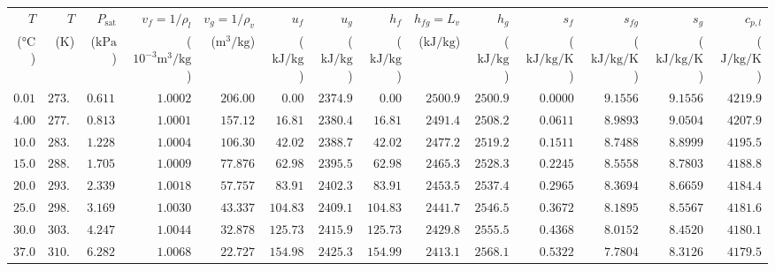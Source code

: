 \documentclass[10pt,twoside,openany,letterpaper]{book}
\begin{document}
\begin{quicksheet}
\begin{formulacard}
\par\smallskip\noindent
\scriptsize\setlength{\tabcolsep}{3.1pt}\renewcommand{\arraystretch}{1.06}
\begin{tabularx}{\linewidth}{@{}r r r r r r r r r r r r r r@{}}
\toprule
$T$ & $T$ & $P_{\mathrm{sat}}$ & $v_f = 1/\rho_l$ & $v_g = 1/\rho_v$ & $u_f$ & $u_g$ & $h_f$ & $h_{fg} = L_v$ & $h_g$ & $s_f$ & $s_{fg}$ & $s_g$ & $c_{p,l}$ \\
($\si{\celsius}$) & ($\si{\kelvin}$) & ($\si{\kilo\pascal}$) & ($10^{-3}\si{\cubic\meter\per\kilogram}$) & ($\si{\cubic\meter\per\kilogram}$) & ($\si{\kilo\joule\per\kilogram}$) & ($\si{\kilo\joule\per\kilogram}$) & ($\si{\kilo\joule\per\kilogram}$) & ($\si{\kilo\joule\per\kilogram}$) & ($\si{\kilo\joule\per\kilogram}$) & ($\si{\kilo\joule\per\kilogram\per\kelvin}$) & ($\si{\kilo\joule\per\kilogram\per\kelvin}$) & ($\si{\kilo\joule\per\kilogram\per\kelvin}$) & ($\si{\joule\per\kilogram\per\kelvin}$) \\
\midrule
$0.01$ & $273.16$ & $0.6117$ & $1.0002$ & $206.00$ & $0.00$ & $2374.9$ & $0.00$ & $2500.9$ & $2500.9$ & $0.0000$ & $9.1556$ & $9.1556$ & $4219.9$ \\
$4.00$ & $277.15$ & $0.8135$ & $1.0001$ & $157.12$ & $16.81$ & $2380.4$ & $16.81$ & $2491.4$ & $2508.2$ & $0.0611$ & $8.9893$ & $9.0504$ & $4207.9$ \\
$10.00$ & $283.15$ & $1.2282$ & $1.0004$ & $106.30$ & $42.02$ & $2388.7$ & $42.02$ & $2477.2$ & $2519.2$ & $0.1511$ & $8.7488$ & $8.8999$ & $4195.5$ \\
$15.00$ & $288.15$ & $1.7058$ & $1.0009$ & $77.876$ & $62.98$ & $2395.5$ & $62.98$ & $2465.3$ & $2528.3$ & $0.2245$ & $8.5558$ & $8.7803$ & $4188.8$ \\
$20.00$ & $293.15$ & $2.3393$ & $1.0018$ & $57.757$ & $83.91$ & $2402.3$ & $83.91$ & $2453.5$ & $2537.4$ & $0.2965$ & $8.3694$ & $8.6659$ & $4184.4$ \\
$25.00$ & $298.15$ & $3.1699$ & $1.0030$ & $43.337$ & $104.83$ & $2409.1$ & $104.83$ & $2441.7$ & $2546.5$ & $0.3672$ & $8.1895$ & $8.5567$ & $4181.6$ \\
$30.00$ & $303.15$ & $4.2470$ & $1.0044$ & $32.878$ & $125.73$ & $2415.9$ & $125.73$ & $2429.8$ & $2555.5$ & $0.4368$ & $8.0152$ & $8.4520$ & $4180.1$ \\
$37.00$ & $310.15$ & $6.2823$ & $1.0068$ & $22.727$ & $154.98$ & $2425.3$ & $154.99$ & $2413.1$ & $2568.1$ & $0.5322$ & $7.7804$ & $8.3126$ & $4179.5$ \\

\end{tabularx}
\end{formulacard}
\end{quicksheet}
\end{document}
